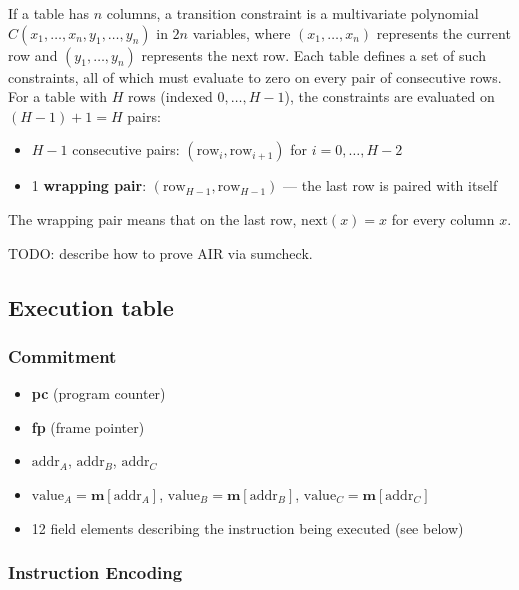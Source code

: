 \documentclass{article}
\theoremstyle{definition}
\begin{document}
If a table has $n$ columns, a transition constraint is a multivariate polynomial $C(x_1, \dots, x_n, y_1, \dots, y_n)$ in $2n$ variables, where $(x_1, \dots, x_n)$ represents the current row and $(y_1, \dots, y_n)$ represents the next row. Each table defines a set of such constraints, all of which must evaluate to zero on every pair of consecutive rows. For a table with $H$ rows (indexed $0, \dots, H-1$), the constraints are evaluated on $(H-1) + 1 = H$ pairs:
\begin{itemize}
    \item $H - 1$ consecutive pairs: $(\text{row}_i, \text{row}_{i+1})$ for $i = 0, \dots, H-2$
    \item 1 \textbf{wrapping pair}: $(\text{row}_{H-1}, \text{row}_{H-1})$ --- the last row is paired with itself
\end{itemize}

The wrapping pair means that on the last row, $\text{next}(x) = x$ for every column $x$.

\vspace{3mm}

TODO: describe how to prove AIR via sumcheck.

\subsection{Execution table}


\subsubsection{Commitment}


\begin{itemize}
    \item \textbf{pc} (program counter)
    \item \textbf{fp} (frame pointer)
    \item $\text{addr}_A$, $\text{addr}_B$, $\text{addr}_C$
    \item $\text{value}_A = \textbf{m}[\text{addr}_A]$, $\text{value}_B = \textbf{m}[\text{addr}_B]$, $\text{value}_C = \textbf{m}[\text{addr}_C]$
    \item 12 field elements describing the instruction being executed (see below)
\end{itemize}


\subsubsection{Instruction Encoding}
\end{document}
